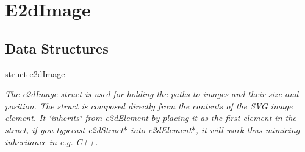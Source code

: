 \hypertarget{group__e2dImage}{\section{E2d\-Image}
\label{group__e2dImage}
}
\subsection*{Data Structures}
\begin{DoxyCompactItemize}
\item 
struct \hyperlink{structe2dImage}{e2d\-Image}
\begin{DoxyCompactList}\small\item\em The \hyperlink{structe2dImage}{e2d\-Image} struct is used for holding the paths to images and their size and position. The struct is composed directly from the contents of the S\-V\-G image element. It \char`\"{}inherits\char`\"{} from \hyperlink{structe2dElement}{e2d\-Element} by placing it as the first element in the struct, if you typecast e2d\-Struct$\ast$ into e2d\-Element$\ast$, it will work thus mimicing inheritance in e.\-g. C++. \end{DoxyCompactList}\end{DoxyCompactItemize}
